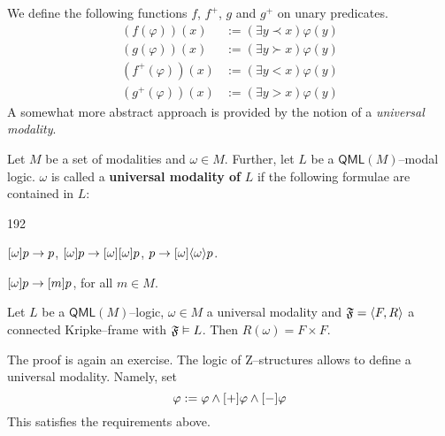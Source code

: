We define the following functions $f$, $f^+$, $g$ and $g^+$ on 
unary predicates.
\begin{equation}
\begin{split}
(f(\varphi))(x) & := (\exists y \prec x)\varphi(y) \\
(g(\varphi))(x) & := (\exists y \succ x)\varphi(y) \\
(f^+(\varphi))(x) & := (\exists y < x)\varphi(y) \\
(g^+(\varphi))(x) & := (\exists y > x)\varphi(y)
\end{split}
\end{equation}
A somewhat more abstract approach is provided by the notion of
a {\it universal modality}.
\begin{defn}
Let $M$ be a set of modalities and $\omega \in M$. Further, let $L$
be a $\mathsf{QML}(M)$--modal logic. $\omega$ is called a
\textbf{universal modality of} $L$ if the following
formulae are contained in $L$:
\begin{dingautolist}{192}
\item $[\omega]p \rightarrow p$, $[\omega]p \rightarrow [\omega][\omega]p$, 
	$p \rightarrow [\omega]\langle \omega\rangle p$.
\item $[\omega]p \rightarrow [m]p$, for all $m \in M$.
\end{dingautolist}
\end{defn}
\begin{prop}
Let $L$ be a $\mathsf{QML}(M)$--logic, $\omega \in M$ a
universal modality and $\mathfrak{F} = \langle F, R\rangle$ a
connected Kripke--frame with $\mathfrak{F} \vDash L$.
Then $R(\omega) = F \times F$.
\end{prop}
The proof is again an exercise. The logic of Z--structures allows 
to define a universal modality. Namely, set
\begin{equation}
[\omega]\varphi := \varphi \und [+]\varphi \und [-]\varphi
\end{equation}
This satisfies the requirements above.

